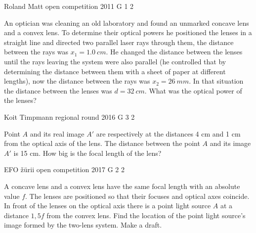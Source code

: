 \documentclass[11pt]{article}
\begin{document}
{Roland Matt} %
{open competition} %
{2011} %
{G 1} %
{2} %
{

\ifEngStatement
An optician was cleaning an old laboratory and found an unmarked concave lens and a convex lens. To determine their optical powers he positioned the lenses in a straight line and directed two parallel laser rays through them, the distance between the rays was $x_{1}=\SI{1,0}{cm}$. He changed the distance between the lenses until the rays leaving the system were also parallel (he controlled that by determining the distance between them with a sheet of paper at different lengths), now the distance between the rays was $x_{2}=\SI{26}{mm}$. In that situation the distance between the lenses was $d=\SI{32}{cm}$. What was the optical power of the lenses?
\fi
}

{Koit Timpmann} %
{regional round} %
{2016} %
{G 3} %
{2} %
{

\ifEngStatement
Point $A$ and its real image $A'$ are respectively at the distances 4 cm and 1 cm from the optical axis of the lens. The distance between the point $A$ and its image $A'$ is 15 cm. How big is the focal length of the lens?
\fi
}

{EFO žürii} %
{open competition} %
{2017} %
{G 2} %
{2} %
{

\ifEngStatement
A concave lens and a convex lens have the same focal length with an absolute value $f$. The lenses are positioned so that their focuses and optical axes coincide. In front of the lenses on the optical axis there is a point light source $A$ at a distance $1,5f$ from the convex lens. Find the location of the point light source's image formed by the two-lens system. Make a draft.
\fi
}
\end{document}
